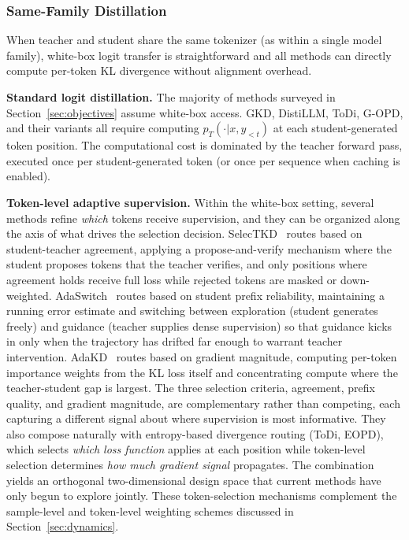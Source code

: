 \documentclass{article} %
\newcommand{\pteacher}{p_T}
\begin{document}
\subsubsection{Same-Family Distillation}
\label{subsubsec:same_family}

When teacher and student share the same tokenizer (as within a single model family), white-box logit transfer is straightforward and all methods can directly compute per-token KL divergence without alignment overhead.

\textbf{Standard logit distillation.} The majority of methods surveyed in Section~\ref{sec:objectives} assume white-box access. GKD, DistiLLM, ToDi, G-OPD, and their variants all require computing $\pteacher(\cdot|x, y_{<t})$ at each student-generated token position. The computational cost is dominated by the teacher forward pass, executed once per student-generated token (or once per sequence when caching is enabled).

\textbf{Token-level adaptive supervision.} Within the white-box setting, several methods refine \emph{which} tokens receive supervision, and they can be organized along the axis of what drives the selection decision. SelecTKD~\citep{2510.24021} routes based on student-teacher agreement, applying a propose-and-verify mechanism where the student proposes tokens that the teacher verifies, and only positions where agreement holds receive full loss while rejected tokens are masked or down-weighted. AdaSwitch~\citep{2510.07842} routes based on student prefix reliability, maintaining a running error estimate and switching between exploration (student generates freely) and guidance (teacher supplies dense supervision) so that guidance kicks in only when the trajectory has drifted far enough to warrant teacher intervention. AdaKD~\citep{2510.11615} routes based on gradient magnitude, computing per-token importance weights from the KL loss itself and concentrating compute where the teacher-student gap is largest. The three selection criteria, agreement, prefix quality, and gradient magnitude, are complementary rather than competing, each capturing a different signal about where supervision is most informative. They also compose naturally with entropy-based divergence routing (ToDi, EOPD), which selects \emph{which loss function} applies at each position while token-level selection determines \emph{how much gradient signal} propagates. The combination yields an orthogonal two-dimensional design space that current methods have only begun to explore jointly. These token-selection mechanisms complement the sample-level and token-level weighting schemes discussed in Section~\ref{sec:dynamics}.
\end{document}
